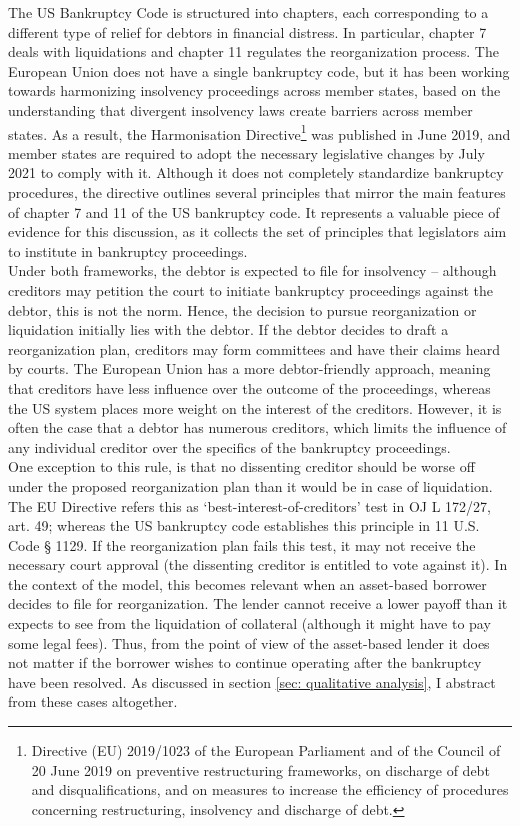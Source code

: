 \documentclass[12pt]{article}
\begin{document}
The US Bankruptcy Code is structured into chapters, each corresponding to a different type of relief for debtors in financial distress. In particular, chapter 7 deals with liquidations and chapter 11 regulates the reorganization process. The European Union does not have a single bankruptcy code, but it has been working towards harmonizing insolvency proceedings across member states, based on the understanding that divergent insolvency laws create barriers across member states. As a result, the Harmonisation Directive\footnote{Directive (EU) 2019/1023 of the European Parliament and of the Council of 20 June 2019 on preventive restructuring frameworks, on discharge of debt and disqualifications, and on measures to increase the efficiency of procedures concerning restructuring, insolvency and discharge of debt.}  was published in June 2019, and member states are required to adopt the necessary legislative changes by July 2021 to comply with it. Although it does not completely standardize bankruptcy procedures, the directive outlines several principles that mirror the main features of chapter 7 and 11 of the US bankruptcy code. It represents a valuable piece of evidence for this discussion, as it collects the set of principles that legislators aim to institute in bankruptcy proceedings. \vspace{3mm} \\
Under both frameworks, the debtor is expected to file for insolvency – although creditors may petition the court to initiate bankruptcy proceedings against the debtor, this is not the norm. Hence, the decision to pursue reorganization or liquidation initially lies with the debtor. If the debtor decides to draft a reorganization plan, creditors may form committees and have their claims heard by courts. The European Union has a more debtor-friendly approach, meaning that creditors have less influence over the outcome of the proceedings, whereas the US system places more weight on the interest of the creditors. However, it is often the case that a debtor has numerous creditors, which limits the influence of any individual creditor over the specifics of the bankruptcy proceedings. \vspace{3mm} \\
One exception to this rule, is that no dissenting creditor should be worse off under the proposed reorganization plan than it would be in case of liquidation. The EU Directive refers this as ‘best-interest-of-creditors’ test in OJ L 172/27, art. 49; whereas the US bankruptcy code establishes this principle in 11 U.S. Code § 1129.  If the reorganization plan fails this test, it may not receive the necessary court approval (the dissenting creditor is entitled to vote against it). In the context of the model, this becomes relevant when an asset-based borrower decides to file for reorganization. The lender cannot receive a lower payoff than it expects to see from the liquidation of collateral (although it might have to pay some legal fees). Thus, from the point of view of the asset-based lender it does not matter if the borrower wishes to continue operating after the bankruptcy have been resolved. As discussed in section \ref{sec: qualitative analysis}, I abstract from these cases altogether.  \vspace{3mm} \\
\end{document}
